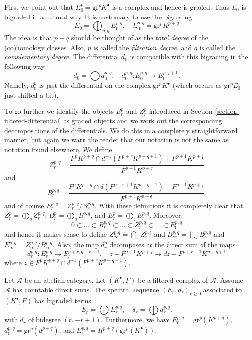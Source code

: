 \medskip\noindent
First we point out that $E_0^p = \text{gr}^p K^\bullet$ is a
complex and hence is graded. Thus $E_0$ is bigraded in a natural
way. It is customary to use the bigrading
$$
E_0 = \bigoplus_{p, q} E_0^{p, q},
\quad
E_0^{p, q} = \text{gr}^p K^{p + q}
$$
The idea is that $p + q$ should be thought of as the {\it total degree} of
the (co)homology classes. Also, $p$ is called the {\it filtration degree},
and $q$ is called the {\it complementary degree}.
The differential $d_0$ is compatible with this
bigrading in the following way
$$
d_0  = \bigoplus d_0^{p, q},
\quad
d_0^{p, q} : E_0^{p, q} \to E_0^{p, q + 1}.
$$
Namely, $d_0^p$ is just the differential on the complex
$\text{gr}^p K^\bullet$ (which occurs as $\text{gr}^pE_0$ just shifted
a bit).

\medskip\noindent
To go further we identify the objects $B_r^p$ and $Z_r^p$ introduced
in Section \ref{section-filtered-differential} as graded objects and
we work out the corresponding decompositions of the differentials.
We do this in a completely straightforward manner, but again we warn
the reader that our notation is not the same as notation found
elsewhere. We define
$$
Z_r^{p, q} =
\frac{F^pK^{p + q} \cap d^{-1}(F^{p + r}K^{p + q + 1}) + F^{p + 1}K^{p + q}}
{F^{p + 1}K^{p + q}}
$$
and
$$
B_r^{p, q} =
\frac{F^pK^{p + q} \cap d(F^{p - r + 1}K^{p + q - 1}) + F^{p + 1}K^{p + q}}
{F^{p + 1}K^{p + q}}.
$$
and of course $E_r^{p, q} = Z_r^{p, q}/B_r^{p, q}$.
With these definitions it is completely clear that
$Z_r^p = \bigoplus_q Z_r^{p, q}$,
$B_r^p = \bigoplus_q B_r^{p, q}$, and
$E_r^p = \bigoplus_q E_r^{p, q}$. Moreover,
$$
0 \subset \ldots \subset B_r^{p, q} \subset
\ldots
\subset Z_r^{p, q} \subset \ldots \subset E_0^{p, q}
$$
and hence it makes sense to define $Z_\infty^{p, q} = \bigcap_r Z_r^{p, q}$
and $B_\infty^{p, q} = \bigcup_r B_r^{p, q}$ and
$E_\infty^{p, q} = Z_\infty^{p, q}/B_\infty^{p, q}$.
Also, the map $d_r^p$ decomposes as the direct sum of the maps
$$
d_r^{p, q} : E_r^{p, q} \longrightarrow E_r^{p + r, q - r + 1},
\quad
z + F^{p + 1}K^{p + q}
\mapsto
dz + F^{p + r + 1}K^{p + q + 1}
$$
where $z \in F^pK^{p + q} \cap d^{-1}(F^{p + r}K^{p + q + 1})$.

\begin{lemma}
\label{lemma-spectral-sequence-filtered-complex}
Let $\mathcal{A}$ be an abelian category.
Let $(K^\bullet, F)$ be a filtered complex of $\mathcal{A}$.
Assume $\mathcal{A}$ has countable direct sums.
The spectral sequence $(E_r, d_r)_{r \geq 0}$
associated to $(K^\bullet, F)$ has bigraded terms
$$
E_r = \bigoplus E_r^{p, q},
\quad
d_r = \bigoplus d_r^{p, q}.
$$
with $d_r$ of bidegree $(r, - r + 1)$.
Furthermore, we have
$E_0^{p, q} = \text{gr}^p(K^{p + q})$,
$d_0^{p, q} = \text{gr}^p(d^{p + q})$,
and $E_1^{p, q} = H^{p + q}(\text{gr}^p(K^\bullet))$.
\end{lemma}

